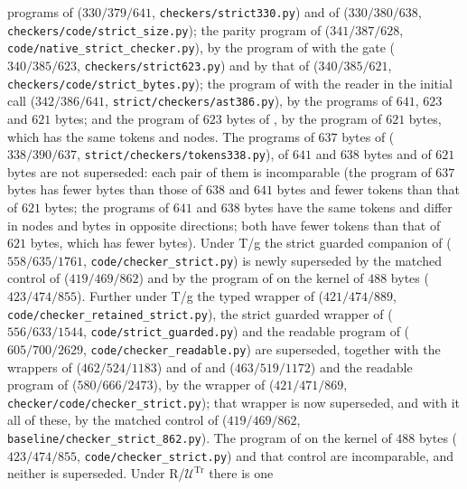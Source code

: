 programs of  ($330/379/641$,
\texttt{checkers/strict330.py}) and of  ($330/380/638$,
\texttt{checkers/code/strict\_size.py}); the parity program of
 ($341/387/628$,
\texttt{code/native\_strict\_checker.py}), by the program of
 with the gate ($340/385/623$,
\texttt{checkers/strict623.py}) and by that of 
($340/385/621$, \texttt{checkers/code/strict\_bytes.py}); the program of
 with the reader in the initial call ($342/386/641$,
\texttt{strict/checkers/ast386.py}), by the programs of $641$, $623$ and $621$
bytes; and the program of $623$ bytes of , by the
program of $621$ bytes, which has the same tokens and nodes. The programs of
$637$ bytes of  ($338/390/637$,
\texttt{strict/checkers/tokens338.py}), of $641$ and $638$ bytes and of $621$
bytes are not superseded: each pair of them is incomparable (the program of
$637$ bytes has fewer bytes than those of $638$ and $641$ bytes and fewer tokens
than that of $621$ bytes; the programs of $641$ and $638$ bytes have the same
tokens and differ in nodes and bytes in opposite directions; both have fewer
tokens than that of $621$ bytes, which has fewer bytes).
Under T/g the strict guarded companion of 
($558/635/1761$, \texttt{code/checker\_strict.py}) is newly superseded by the
matched control of  ($419/469/862$) and by the program of
 on the kernel of $488$ bytes ($423/474/855$). Further under T/g the typed wrapper of  ($421/474/889$,
\texttt{code/checker\_retained\_strict.py}), the strict guarded wrapper of
 ($556/633/1544$, \texttt{code/strict\_guarded.py}) and
the readable program of  ($605/700/2629$,
\texttt{code/checker\_readable.py}) are superseded, together with the
wrappers of  ($462/524/1183$) and of
 and  ($463/519/1172$)
and the readable program of  ($580/666/2473$), by the
wrapper of  ($421/471/869$,
\texttt{checker/code/checker\_strict.py}); that wrapper is now superseded, and
with it all of these, by the matched control of 
($419/469/862$, \texttt{baseline/checker\_strict\_862.py}). The program of
 on the kernel of $488$ bytes ($423/474/855$,
\texttt{code/checker\_strict.py}) and that control are incomparable, and
neither is superseded. Under R/$\mathcal U^{\mathrm{Tr}}$ there is one

